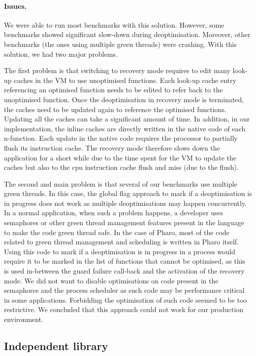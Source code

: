 \documentclass[a4paper,12pt,twoside]{../includes/ThesisStyle}
\begin{document}
\paragraph{Issues.} We were able to run most benchmarks with this solution. However, some benchmarks showed significant slow-down during deoptimisation. Moreover, other benchmarks (the ones using multiple green threads) were crashing. With this solution, we had two major problems. 

The first problem is that switching to recovery mode requires to edit many look-up caches in the VM to use unoptimised functions. Each look-up cache entry referencing an optimised function needs to be edited to refer back to the unoptimised function. Once the deoptimisation in recovery mode is terminated, the caches need to be updated again to reference the optimised functions. Updating all the caches can take a significant amount of time. In addition, in our implementation, the inline caches are directly written in the native code of each n-function. Each update in the native code requires the processor to partially flush its instruction cache. The recovery mode therefore slows down the application for a short while due to the time spent for the VM to update the caches but also to the cpu instruction cache flush and miss (due to the flush).

The second and main problem is that several of our benchmarks use multiple green threads. In this case, the global flag approach to mark if a deoptimisation is in progress does not work as multiple deoptimisations may happen concurrently. In a normal application, when such a problem happens, a developer uses semaphores or other green thread management features present in the language to make the code green thread safe. In the case of Pharo, most of the code related to green thread management and scheduling is written in Pharo itself. Using this code to mark if a deoptimisation is in progress in a process would require it to be marked in the list of functions that cannot be optimised, as this is used in-between the guard failure call-back and the activation of the recovery mode. We did not want to disable optimisations on code present in the semaphores and the process scheduler as such code may be performance critical in some applications. Forbidding the optimisation of such code seemed to be too restrictive. We concluded that this approach could not work for our production environment.

\subsection{Independent library}
\label{sec:independentLib}
\end{document}
